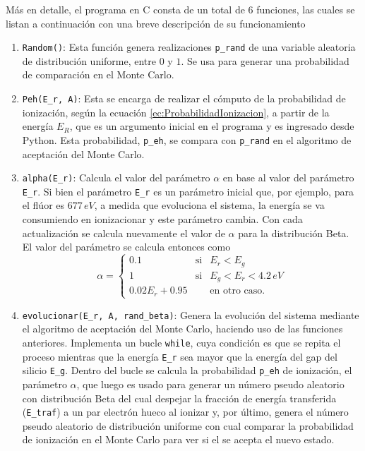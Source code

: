 Más en detalle, el programa en C consta de un total de $6$ funciones, las cuales se listan a continuación con una breve descripción de su funcionamiento
\begin{enumerate}[label=\arabic*., listparindent=1.5em]
    \item \verb|Random()|: Esta función genera realizaciones \verb|p_rand| de una variable aleatoria de distribución uniforme, entre $0$ y $1$. Se usa para generar una probabilidad de comparación en el Monte Carlo.
    \item \verb|Peh(E_r, A)|: Esta se encarga de realizar el cómputo de la probabilidad de ionización, según la ecuación \eqref{ec:ProbabilidadIonizacion}, a partir de la energía $E_{R}$, que es un argumento inicial en el programa y es ingresado desde Python. Esta probabilidad, \verb|p_eh|, se compara con \verb|p_rand| en el algoritmo de aceptación del Monte Carlo.
    \item \verb|alpha(E_r)|: Calcula el valor del parámetro $\alpha$ en base al valor del parámetro \verb|E_r|. Si bien el parámetro \verb|E_r| es un parámetro inicial que, por ejemplo, para el flúor es $677\,\si{eV}$, a medida que evoluciona el sistema, la energía se va consumiendo en ionizacionar y este parámetro cambia. Con cada actualización se calcula nuevamente el valor de $\alpha$ para la distribución Beta. El valor del parámetro se calcula entonces como
    \begin{equation*}
        \alpha =
        \left\{ \begin{array}{lcc}
             0.1 & \mbox{si} & E_{r} < E_{g}\\
             1 & \mbox{si} & E_{g} < E_{r} < 4.2\,\si{eV}\\
             0.02E_{r} + 0.95 & & \mbox{en otro caso.}
             \end{array}
        \right.
    \end{equation*}
    \item \verb|evolucionar(E_r, A, rand_beta)|: Genera la evolución del sistema mediante el algoritmo de aceptación del Monte Carlo, haciendo uso de las funciones anteriores. Implementa un bucle \verb|while|, cuya condición es que se repita el proceso mientras que la energía \verb|E_r| sea mayor que la energía del gap del silicio \verb|E_g|. Dentro del bucle se calcula la probabilidad \verb|p_eh| de ionización, el parámetro $\alpha$, que luego es usado para generar un número pseudo aleatorio con distribución Beta del cual despejar la fracción de energía transferida (\verb|E_traf|) a un par electrón hueco al ionizar y, por último, genera el número pseudo aleatorio de distribución uniforme con cual comparar la probabilidad de ionización en el Monte Carlo para ver si el se acepta el nuevo estado.\\

\end{enumerate}
